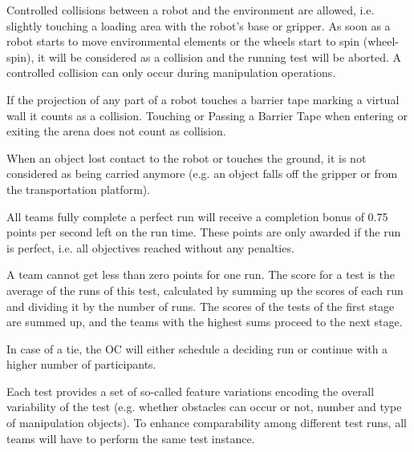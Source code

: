 Controlled collisions between a robot and the environment are allowed, i.e. slightly touching a loading area with the robot's base or gripper. As soon as a robot starts to move environmental elements or the wheels start to spin (wheel-spin), it will be considered as a collision and the running test will be aborted. A controlled collision can only occur during manipulation operations.
\par
If the projection of any part of a robot touches a barrier tape marking a virtual wall it counts as a collision. Touching or Passing a Barrier Tape when entering or exiting the arena does not count as collision.
\par
When an object lost contact to the robot or touches the ground, it is not considered as being carried anymore (e.g. an object falls off the gripper or from the transportation platform).
\par
All teams fully complete a perfect run will receive a completion bonus of 0.75 points per second left on the run time. These points are only awarded if the run is perfect, i.e. all objectives reached without any penalties.
\par
A team cannot get less than zero points for one run. The score for a test is the average of the runs of this test, calculated by summing up the scores of each run and dividing it by the number of runs. The scores of the tests of the first stage are summed up, and the teams with the highest sums proceed to the next stage.
\par
In case of a tie, the OC will either schedule a deciding run or continue with a higher number of participants.
\par
\par

Each test provides a set of so-called feature variations encoding the overall variability of the test (e.g. whether obstacles can occur or not, number and type of manipulation objects). To enhance comparability among different test runs, all teams will have to perform the same test instance.


